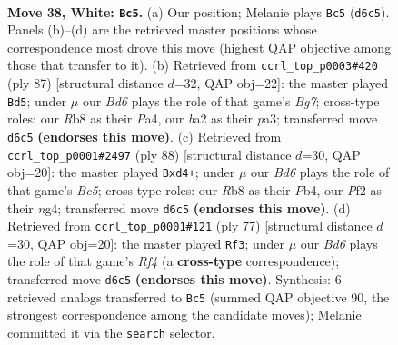 \documentclass[11pt]{article}
\begin{document}
\clearpage

\begin{figure}[p]\centering
\begin{subfigure}{0.46\textwidth}\centering
\resizebox{\linewidth}{!}{%
\newchessgame
\chessboard[
  setfen={1R6/6k1/3B4/4p3/4r2p/5p1P/b4P2/5BK1 w - - 4 38},
  showmover=false,
  pgfstyle=straightmove, color=movearrow, markmove={d6-c5}
]}
\caption{}
\end{subfigure}\hfill
\begin{subfigure}{0.46\textwidth}\centering
\resizebox{\linewidth}{!}{%
\newchessgame
\chessboard[
  setfen={8/5pk1/3b1p2/5P2/p2P4/P1K1R2P/6b1/8 b - - 1 44},
  showmover=false,
  pgfstyle=straightmove, color=movearrow, markmove={g2-d5}
]}
\caption{}
\end{subfigure}
\\[4pt]
\begin{subfigure}{0.46\textwidth}\centering
\resizebox{\linewidth}{!}{%
\newchessgame
\chessboard[
  setfen={4R3/1p3rk1/8/1pB3p1/1P1p2n1/6P1/1P4K1/8 w - - 0 45},
  showmover=false,
  pgfstyle=straightmove, color=movearrow, markmove={c5-d4}
]}
\caption{}
\end{subfigure}\hfill
\begin{subfigure}{0.46\textwidth}\centering
\resizebox{\linewidth}{!}{%
\newchessgame
\chessboard[
  setfen={3k4/2p4p/4RPb1/5r2/8/2BP3P/8/7K b - - 0 39},
  showmover=false,
  pgfstyle=straightmove, color=movearrow, markmove={f5-f3}
]}
\caption{}
\end{subfigure}
\caption{\textbf{Move 38, White: \texttt{Bc5}.} (a) Our position; Melanie plays \texttt{Bc5} (\texttt{d6c5}). Panels (b)--(d) are the retrieved master positions whose correspondence most drove this move (highest QAP objective among those that transfer to it). (b) Retrieved from \texttt{ccrl\_top\_p0003\#420} (ply 87) [structural distance $d$=32, QAP obj=22]: the master played \texttt{Bd5}; under $\mu$ our \emph{Bd6} plays the role of that game's \emph{Bg7}; cross-type roles: our \emph{R}b8 as their \emph{P}a4, our \emph{b}a2 as their \emph{p}a3; transferred move \texttt{d6c5} \textbf{(endorses this move)}. (c) Retrieved from \texttt{ccrl\_top\_p0001\#2497} (ply 88) [structural distance $d$=30, QAP obj=20]: the master played \texttt{Bxd4+}; under $\mu$ our \emph{Bd6} plays the role of that game's \emph{Bc5}; cross-type roles: our \emph{R}b8 as their \emph{P}b4, our \emph{P}f2 as their \emph{n}g4; transferred move \texttt{d6c5} \textbf{(endorses this move)}. (d) Retrieved from \texttt{ccrl\_top\_p0001\#121} (ply 77) [structural distance $d$=30, QAP obj=20]: the master played \texttt{Rf3}; under $\mu$ our \emph{Bd6} plays the role of that game's \emph{Rf4} (a \textbf{cross-type} correspondence); transferred move \texttt{d6c5} \textbf{(endorses this move)}. Synthesis: 6 retrieved analogs transferred to \texttt{Bc5} (summed QAP objective 90, the strongest correspondence among the candidate moves); Melanie committed it via the \texttt{search} selector.}
\label{fig:thought-m74}
\end{figure}
\end{document}
